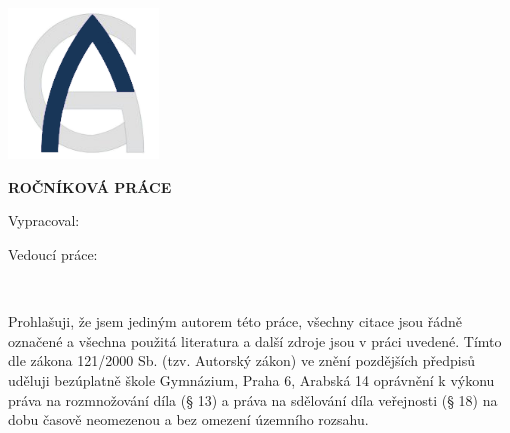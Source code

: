 
\pagestyle{empty}
\hypersetup{pageanchor=false}

\begin{center}

{\LARGE\bfseries\NazevSkoly}

\vspace{-18mm}
\vfill

{\LARGE\NazevOboru}

\vfill

\centerline{\mbox{\includegraphics[height=4cm]{../img/logo.png}}}

\vspace{-8mm}
\vfill

{\bf\Large ROČNÍKOVÁ PRÁCE}

\vfill


\vspace{15mm}

{\LARGE\bfseries\NazevPrace}


\vfill


Vypracoval: \hfill \AutorPrace

Vedoucí práce: \hfill \Vedouci

\vspace{15mm}
\MesicOdevzdani \ \RokOdevzdani

\end{center}



\newpage
\hypersetup{pageanchor=true}
\pagestyle{plain}


\openright


\vspace*{\fill}


\noindent
Prohlašuji, že jsem jediným autorem této práce, všechny citace jsou řádně označené a všechna použitá literatura a další zdroje jsou v práci uvedené.
Tímto dle zákona 121/2000 Sb. (tzv. Autorský zákon) ve znění pozdějších předpisů uděluji bezúplatně škole Gymnázium, Praha 6, Arabská 14 oprávnění k výkonu práva na rozmnožování díla (§ 13) a práva na sdělování díla veřejnosti (§ 18) na dobu časově neomezenou a bez omezení územního rozsahu.


